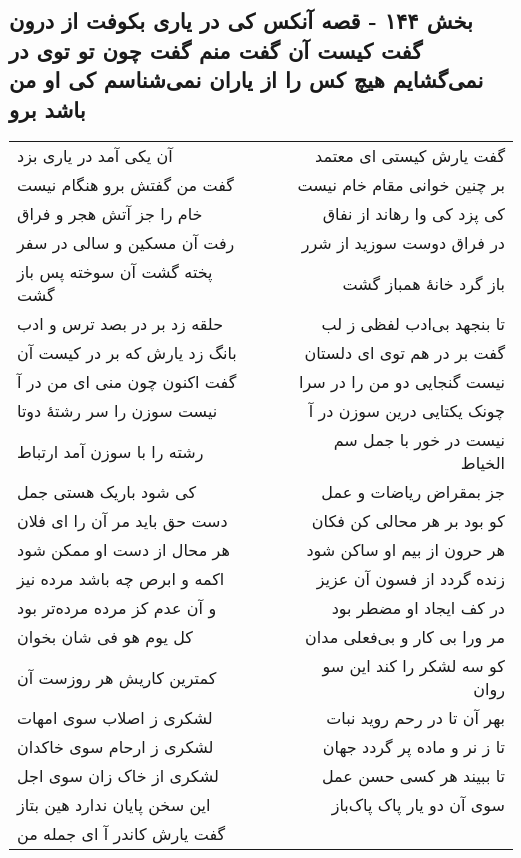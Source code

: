 \begin{center}
\section*{بخش ۱۴۴ - قصه آنکس کی در یاری بکوفت از درون گفت کیست آن گفت منم گفت چون تو توی در نمی‌گشایم هیچ کس را از یاران نمی‌شناسم کی او من باشد برو}
\label{sec:sh144}
\begin{longtable}{l p{0.5cm} r}
آن یکی آمد در یاری بزد
&&
گفت یارش کیستی ای معتمد
\\
گفت من گفتش برو هنگام نیست
&&
بر چنین خوانی مقام خام نیست
\\
خام را جز آتش هجر و فراق
&&
کی پزد کی وا رهاند از نفاق
\\
رفت آن مسکین و سالی در سفر
&&
در فراق دوست سوزید از شرر
\\
پخته گشت آن سوخته پس باز گشت
&&
باز گرد خانهٔ همباز گشت
\\
حلقه زد بر در بصد ترس و ادب
&&
تا بنجهد بی‌ادب لفظی ز لب
\\
بانگ زد یارش که بر در کیست آن
&&
گفت بر در هم توی ای دلستان
\\
گفت اکنون چون منی ای من در آ
&&
نیست گنجایی دو من را در سرا
\\
نیست سوزن را سر رشتهٔ دوتا
&&
چونک یکتایی درین سوزن در آ
\\
رشته را با سوزن آمد ارتباط
&&
نیست در خور با جمل سم الخیاط
\\
کی شود باریک هستی جمل
&&
جز بمقراض ریاضات و عمل
\\
دست حق باید مر آن را ای فلان
&&
کو بود بر هر محالی کن فکان
\\
هر محال از دست او ممکن شود
&&
هر حرون از بیم او ساکن شود
\\
اکمه و ابرص چه باشد مرده نیز
&&
زنده گردد از فسون آن عزیز
\\
و آن عدم کز مرده مرده‌تر بود
&&
در کف ایجاد او مضطر بود
\\
کل یوم هو فی شان بخوان
&&
مر ورا بی کار و بی‌فعلی مدان
\\
کمترین کاریش هر روزست آن
&&
کو سه لشکر را کند این سو روان
\\
لشکری ز اصلاب سوی امهات
&&
بهر آن تا در رحم روید نبات
\\
لشکری ز ارحام سوی خاکدان
&&
تا ز نر و ماده پر گردد جهان
\\
لشکری از خاک زان سوی اجل
&&
تا ببیند هر کسی حسن عمل
\\
این سخن پایان ندارد هین بتاز
&&
سوی آن دو یار پاک پاک‌باز
\\
گفت یارش کاندر آ ای جمله من

\end{longtable}
\end{center}
